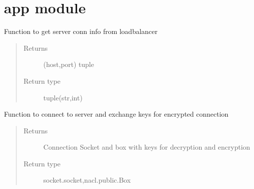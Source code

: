 \documentclass[letterpaper,10pt,english]{sphinxmanual}
\begin{document}
\section{app module}
\label{\detokenize{app:module-app}}\label{\detokenize{app:app-module}}\label{\detokenize{app::doc}}

\begin{fulllineitems}
\label{\detokenize{app:app.getPassword}}
\end{fulllineitems}


\begin{fulllineitems}
\label{\detokenize{app:app.getAddressToConnect}}
Function to get server conn info from loadbalancer
\begin{quote}\begin{description}
\item[{Returns}] \leavevmode
(host,port) tuple

\item[{Return type}] \leavevmode
tuple(str,int)

\end{description}\end{quote}

\end{fulllineitems}


\begin{fulllineitems}
\label{\detokenize{app:app.connectToServer}}
Function to connect to server and exchange keys for encrypted connection
\begin{quote}\begin{description}
\item[{Returns}] \leavevmode
Connection Socket and box with keys for decryption and encryption

\item[{Return type}] \leavevmode
socket.socket,nacl.public.Box

\end{description}\end{quote}

\end{fulllineitems}
\end{document}
